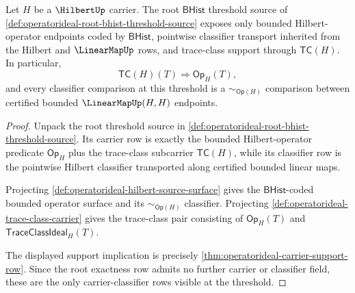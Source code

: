 \begin{theorem}
\label{thm:operatorideal-root-bhist-carrier-classifier-threshold}
Let $H$ be a $\HilbertUp$ carrier. The root $\mathsf{BHist}$ threshold source of \autoref{def:operatorideal-root-bhist-threshold-source} exposes only bounded Hilbert-operator endpoints coded by $\mathsf{BHist}$, pointwise classifier transport inherited from the Hilbert and $\LinearMapUp$ rows, and trace-class support through $\mathsf{TC}(H)$. In particular,
$$
\mathsf{TC}(H)(T)\Longrightarrow \mathsf{Op}_H(T),
$$
and every classifier comparison at this threshold is a $\sim_{\mathsf{Op}(H)}$ comparison between certified bounded $\LinearMapUp(H,H)$ endpoints.
\end{theorem}
\begin{proof}
Unpack the root threshold source in \autoref{def:operatorideal-root-bhist-threshold-source}. Its carrier row is exactly the bounded Hilbert-operator predicate $\mathsf{Op}_H$ plus the trace-class subcarrier $\mathsf{TC}(H)$, while its classifier row is the pointwise Hilbert classifier transported along certified bounded linear maps.

Projecting \autoref{def:operatorideal-hilbert-source-surface} gives the $\mathsf{BHist}$-coded bounded operator surface and its $\sim_{\mathsf{Op}(H)}$ classifier. Projecting \autoref{def:operatorideal-trace-class-carrier} gives the trace-class pair consisting of $\mathsf{Op}_H(T)$ and $\mathsf{TraceClassIdeal}_H(T)$.

The displayed support implication is precisely \autoref{thm:operatorideal-carrier-support-row}. Since the root exactness row admits no further carrier or classifier field, these are the only carrier-classifier rows visible at the threshold.
\end{proof}

